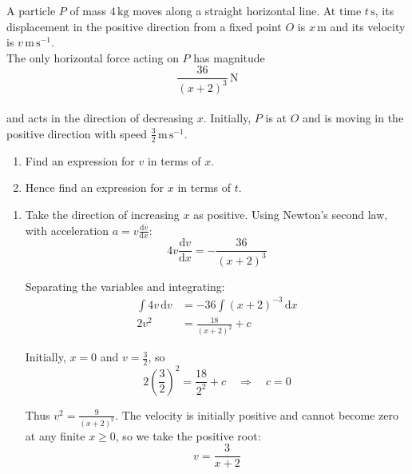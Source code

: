 \documentclass[leqno]{article}
\begin{document}
\djsFrontMatter
\begin{enumerate}[
  label=\textbf{\arabic*.},
  leftmargin=*,
  topsep=0pt,
  partopsep=0pt,
  parsep=0pt
]

\questionitem

A particle $P$ of mass $4\,\mathrm{kg}$ moves along a straight horizontal line. At time $t\,\mathrm{s}$, its displacement in the positive direction from a fixed point $O$ is $x\,\mathrm{m}$ and its velocity is $v\,\mathrm{m\,s^{-1}}$. \\

The only horizontal force acting on $P$ has magnitude
\[
\dfrac{36}{(x+2)^3}\,\mathrm{N}
\] \\
and acts in the direction of decreasing $x$. Initially, $P$ is at $O$ and is moving in the positive direction with speed $\frac{3}{2}\,\mathrm{m\,s^{-1}}$. \\

\begin{enumerate}[label=\textbf{(\alph*)}]
  \item Find an expression for $v$ in terms of $x$.  \\
  \item Hence find an expression for $x$ in terms of $t$.  \\
\end{enumerate}

\vspace*{10pt}

\begin{djsSolution}
\begin{enumerate}[label=\textbf{(\alph*)}, start=1]
\item Take the direction of increasing \(x\) as positive. Using Newton's second law, with acceleration \(a=v\frac{\mathrm{d}v}{\mathrm{d}x}\):
\[
4v\frac{\mathrm{d}v}{\mathrm{d}x}=-\frac{36}{(x+2)^3}
\]

Separating the variables and integrating:
\begin{align*}
\int 4v\,\mathrm{d}v&=-36\int (x+2)^{-3}\,\mathrm{d}x\\
2v^2&=\frac{18}{(x+2)^2}+c
\end{align*}

Initially, \(x=0\) and \(v=\frac32\), so
\[
2\left(\frac32\right)^2=\frac{18}{2^2}+c
\quad\Longrightarrow\quad c=0
\]

Thus \(v^2=\frac{9}{(x+2)^2}\). The velocity is initially positive and cannot become zero at any finite \(x\geq 0\), so we take the positive root:
\[
v=\frac{3}{x+2}
\]


\end{enumerate}
\end{djsSolution}
\end{enumerate}
\end{document}
